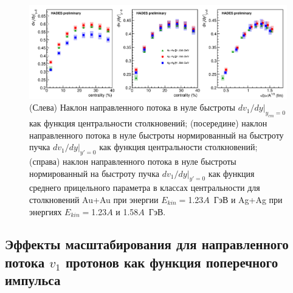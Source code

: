 \begin{figure}[ht]
\begin{center}
\includegraphics[width=0.9\linewidth]{images/dv1dy_many_plot.png}
\caption{ 
(Слева) Наклон направленного потока в нуле быстроты $dv_1/dy|_{y_{cm}=0}$ как функция центральности столкновений;
(посередине) наклон направленного потока в нуле быстроты нормированный на быстроту пучка $dv_1/dy|_{y'=0}$ как функция центральности столкновений;
(справа) наклон направленного потока в нуле быстроты нормированный на быстроту пучка $dv_1/dy|_{y'=0}$ как функция среднего прицельного параметра в классах центральности
для столкновений Au+Au при энергии $E_{kin}=$1.23$A$~ГэВ и Ag+Ag при энергиях $E_{kin}=$1.23$A$ и 1.58$A$~ГэВ. }
\label{fig:hades_dv1dy_many_plot}
\end{center}
\end{figure}

\subsection{Эффекты масштабирования для направленного потока $v_1$ протонов как функция поперечного импульса}


